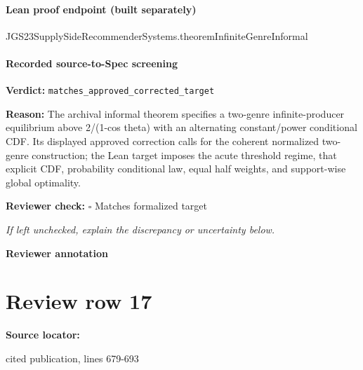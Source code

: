 \documentclass[10pt]{article}
\newcommand{\reviewerbox}{%
  \par\noindent\fbox{\parbox{0.96\linewidth}{\rule{0pt}{0.38in}}}\par
}
\newcommand{\reviewmatch}[1]{%
  \par\noindent\textbf{Reviewer check:} $\square$\; #1\par
  \noindent\emph{If left unchecked, explain the discrepancy or uncertainty below.}\par
}
\begin{document}
\paragraph{Lean proof endpoint (built separately)}\begin{ReviewVerbatim}
JGS23SupplySideRecommenderSystems.theoremInfiniteGenreInformal
\end{ReviewVerbatim}

\paragraph{Recorded source-to-Spec screening}
\textbf{Verdict:} \texttt{matches\_approved\_corrected\_target}
\\
{\raggedright
\textbf{Reason:} The archival informal theorem specifies a two-\allowbreak{}genre infinite-\allowbreak{}producer equilibrium above 2/\allowbreak{}(1-\allowbreak{}cos theta) with an alternating constant/\allowbreak{}power conditional CDF.\allowbreak{} Its displayed approved correction calls for the coherent normalized two-\allowbreak{}genre construction;\allowbreak{} the Lean target imposes the acute threshold regime, that explicit CDF, probability conditional law, equal half weights, and support-\allowbreak{}wise global optimality.\allowbreak{}
\par}
\reviewmatch{Matches formalized target}
\noindent\textbf{Reviewer annotation}\par
\reviewerbox
\clearpage
\hypertarget{source-claim-7b9a422d7c8bad5a}{}
\section*{Review row 17}
\textbf{Source locator:} {\footnotesize\raggedright cited publication, lines 679-\allowbreak{}693\par}
\end{document}
